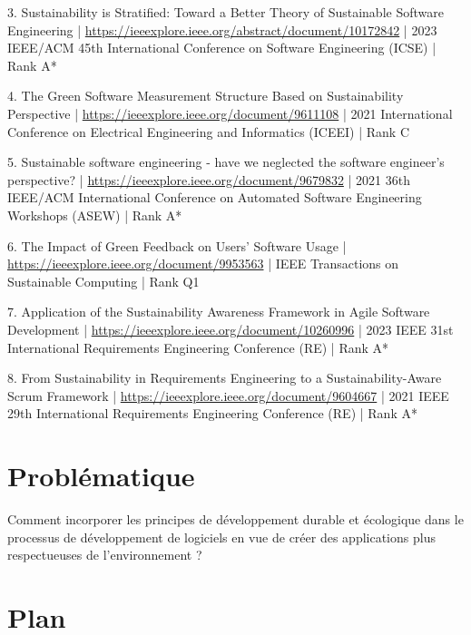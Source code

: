 3. Sustainability is Stratified: Toward a Better Theory of Sustainable Software Engineering | \href{https://ieeexplore.ieee.org/abstract/document/10172842}{https://ieeexplore.ieee.org/abstract/document/10172842} | 2023 IEEE/ACM 45th International Conference on Software Engineering (ICSE) | Rank A*

4. The Green Software Measurement Structure Based on Sustainability Perspective | \href{https://ieeexplore.ieee.org/document/9611108}{https://ieeexplore.ieee.org/document/9611108} | 2021 International Conference on Electrical Engineering and Informatics (ICEEI) | Rank C

5. Sustainable software engineering - have we neglected the software engineer's perspective? | \href{https://ieeexplore.ieee.org/document/9679832}{https://ieeexplore.ieee.org/document/9679832} | 2021 36th IEEE/ACM International Conference on Automated Software Engineering Workshops (ASEW) | Rank A*

6. The Impact of Green Feedback on Users’ Software Usage | \href{https://ieeexplore.ieee.org/document/9953563}{https://ieeexplore.ieee.org/document/9953563} | IEEE Transactions on Sustainable Computing | Rank Q1

7. Application of the Sustainability Awareness Framework in Agile Software Development | \href{https://ieeexplore.ieee.org/document/10260996}{https://ieeexplore.ieee.org/document/10260996} | 2023 IEEE 31st International Requirements Engineering Conference (RE) | Rank A*

8. From Sustainability in Requirements Engineering to a Sustainability-Aware Scrum Framework | \href{https://ieeexplore.ieee.org/document/9604667}{https://ieeexplore.ieee.org/document/9604667} | 2021 IEEE 29th International Requirements Engineering Conference (RE) | Rank A*

\section{Problématique}

Comment incorporer les principes de développement durable et écologique dans le processus de développement de logiciels en vue de créer des applications plus respectueuses de l'environnement ?

\section{Plan}

